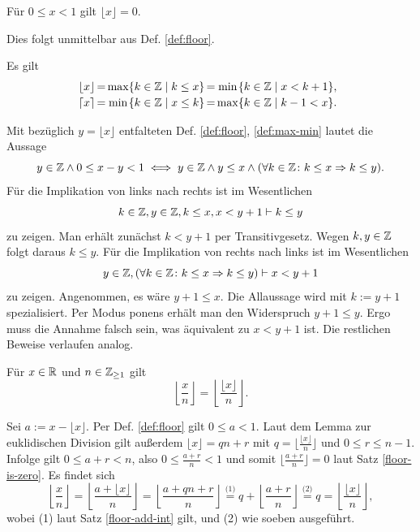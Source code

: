 \begin{Satz}\label{floor-is-zero}
Für $0\le x < 1$ gilt $\lfloor x\rfloor = 0$.
\end{Satz}
\begin{Beweis}
Dies folgt unmittelbar aus Def. \ref{def:floor}.\,\qedsymbol
\end{Beweis}

\begin{Satz}
Es gilt
\[\begin{array}{@{}l@{\,}c@{\,}c@{}l@{\,}c@{\,}c@{}l}
\lfloor x\rfloor &=& \max &\{k\in\Z\mid k\le x\} &=& \min &\{k\in\Z\mid x < k + 1\},\\[2pt]
\lceil x\rceil &=& \min &\{k\in\Z\mid x\le k\} &=& \max &\{k\in\Z\mid k - 1 < x\}.
\end{array}\]
\end{Satz}
\begin{Beweis}
Mit bezüglich $y=\lfloor x\rfloor$ entfalteten Def. \ref{def:floor},
\ref{def:max-min} lautet die Aussage
\[y\in\mathbb Z\land 0\le x-y<1\iff
y\in\mathbb Z\land y\le x\land (\forall k\in\mathbb Z\colon k\le x\Rightarrow k\le y).\]
Für die Implikation von links nach rechts ist im Wesentlichen
\[k\in\mathbb Z, y\in\mathbb Z, k\le x, x < y+1\vdash k\le y\]
zu zeigen. Man erhält zunächst $k < y+1$ per Transitivgesetz.
Wegen $k,y\in\mathbb Z$ folgt daraus $k\le y$. Für die Implikation von rechts
nach links ist im Wesentlichen
\[y\in\mathbb Z,(\forall k\in\mathbb Z\colon k\le x\Rightarrow k\le y)\vdash x < y + 1\]
zu zeigen. Angenommen, es wäre $y+1\le x$. Die Allaussage wird mit
$k:=y+1$ spezialisiert. Per Modus ponens erhält man den Widerspruch
$y+1\le y$. Ergo muss die Annahme falsch sein, was äquivalent zu
$x<y+1$ ist. Die restlichen Beweise verlaufen analog.\,\qedsymbol
\end{Beweis}

\begin{Satz}\label{floor-div-floor}
Für $x\in\mathbb R$ und $n\in\mathbb Z_{\ge 1}$ gilt
\[\left\lfloor\frac{x}{n}\right\rfloor
= \left\lfloor\frac{\lfloor x\rfloor}{n}\right\rfloor.\]
\end{Satz}
\begin{Beweis}
Sei $a:=x-\lfloor x\rfloor$. Per Def. \ref{def:floor} gilt $0 \le a < 1$.
Laut dem Lemma zur euklidischen Division gilt außerdem
$\lfloor x\rfloor = qn+r$
mit $q=\lfloor\frac{\lfloor x\rfloor}{n}\rfloor$
und $0\le r\le n - 1$. Infolge gilt $0\le a+r<n$, also
$0\le\frac{a+r}{n}<1$ und somit $\lfloor\frac{a+r}{n}\rfloor = 0$
laut Satz \ref{floor-is-zero}.
Es findet sich%
\[\left\lfloor\frac{x}{n}\right\rfloor
= \left\lfloor\frac{a+\lfloor x\rfloor}{n}\right\rfloor
= \left\lfloor\frac{a+qn+r}{n}\right\rfloor
\stackrel{\text{(1)}}= q + \left\lfloor\frac{a+r}{n}\right\rfloor
\stackrel{\text{(2)}}= q =
\left\lfloor\frac{\lfloor x\rfloor}{n}\right\rfloor,\]
wobei (1) laut Satz \ref{floor-add-int} gilt, und (2)
wie soeben ausgeführt.\,\qedsymbol
\end{Beweis}

